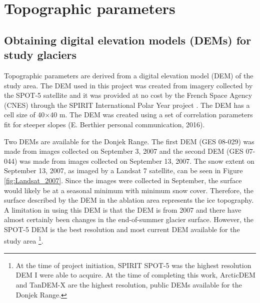 \documentclass{sfuthesis}
\begin{document}
\section{Topographic parameters}

\subsection{Obtaining digital elevation models (DEMs) for study glaciers}

Topographic parameters are derived from a digital elevation model (DEM) of the study area. The DEM used in this project was created from imagery collected by the SPOT-5 satellite and it was provided at no cost by the French Space Agency (CNES) through the SPIRIT International Polar Year project \citep{Korona2009}. The DEM has a cell size of 40$\times$40 m. The DEM was created using a set of correlation parameters fit for steeper slopes (E. Berthier personal communication, 2016). 

Two DEMs are available for the Donjek Range. The first DEM (GES 08-029) was made from images collected on September 3, 2007 and the second DEM (GES 07-044) was made from images collected on September 13, 2007. The snow extent on September 13, 2007, as imaged by a Landsat 7 satellite, can be seen in Figure \ref{fig:Landsat_2007}. Since the images were collected in September, the surface would likely be at a seasonal minimum with minimum snow cover. Therefore, the surface described by the DEM in the ablation area represents the ice topography. A limitation in using this DEM is that the DEM is from 2007 and there have almost certainly been changes in the end-of-summer glacier surface. However, the SPOT-5 DEM is the best resolution and most current DEM available for the study area \footnote{At the time of project initiation, SPIRIT SPOT-5 was the highest resolution DEM I were able to acquire. At the time of completing this work, ArcticDEM and TanDEM-X are the highest resolution, public DEMs available for the Donjek Range.}. 
\end{document}
